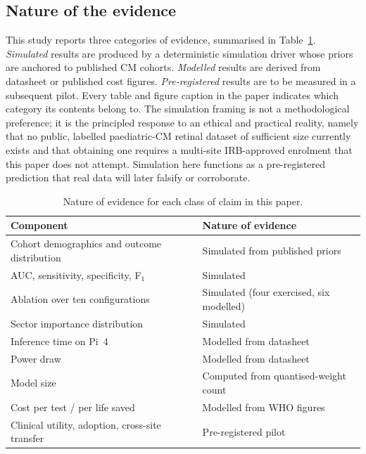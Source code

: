 \documentclass[twocolumn,10pt]{article}
\begin{document}
\subsection{Nature of the evidence}
\label{sec:evidence}
This study reports three categories of evidence, summarised in
Table~\ref{tab:evidence}. \emph{Simulated} results are produced by
a deterministic simulation driver whose priors are anchored to
published CM cohorts. \emph{Modelled} results are derived from
datasheet or published cost figures. \emph{Pre-registered}
results are to be measured in a subsequent pilot. Every table and
figure caption in the paper indicates which category its contents
belong to. The simulation framing is not a methodological
preference; it is the principled response to an ethical and
practical reality, namely that no public, labelled paediatric-CM
retinal dataset of sufficient size currently exists and that
obtaining one requires a multi-site IRB-approved enrolment that
this paper does not attempt. Simulation here functions as a
pre-registered prediction that real data will later falsify or
corroborate.

\begin{table}[!t]
\caption{Nature of evidence for each class of claim in this paper.}
\label{tab:evidence}
\footnotesize
\begin{tabular}{@{}p{}p{}@{}}
\toprule
Component & Nature of evidence \\
\midrule
Cohort demographics and outcome distribution & Simulated from published priors \\
AUC, sensitivity, specificity, F$_1$ & Simulated \\
Ablation over ten configurations & Simulated (four exercised, six modelled) \\
Sector importance distribution & Simulated \\
Inference time on Pi~4 & Modelled from datasheet \\
Power draw & Modelled from datasheet \\
Model size & Computed from quantised-weight count \\
Cost per test / per life saved & Modelled from WHO figures \\
Clinical utility, adoption, cross-site transfer & Pre-registered pilot \\
\bottomrule
\end{tabular}
\end{table}
\end{document}
